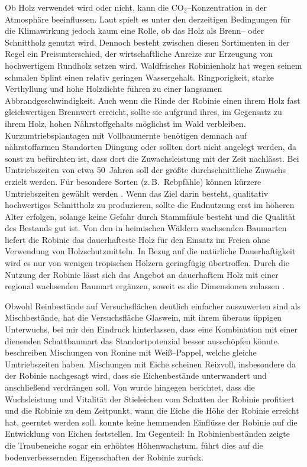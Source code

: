 \documentclass[twocolumn]{scrartcl}
\begin{document}
Ob Holz verwendet wird oder nicht, kann die CO$_2$--Konzentration in
der Atmosphäre beeinflussen. Laut
\citet{boiger2024schnittholzBrennholz} spielt es unter den derzeitigen
Bedingungen für die Klimawirkung jedoch kaum eine Rolle, ob das Holz
als Brenn-- oder Schnittholz genutzt wird. Dennoch besteht zwischen
diesen Sortimenten in der Regel ein Preisunterschied, der
wirtschaftliche Anreize zur Erzeugung von hochwertigem Rundholz setzen
wird. Waldfrisches Robinienholz hat wegen seinem schmalen Splint einen
relativ geringen Wassergehalt.  Ringporigkeit, starke Verthyllung und
hohe Holzdichte führen zu einer langsamen Abbrandgeschwindigkeit.
Auch wenn die Rinde der Robinie einen ihrem Holz fast gleichwertigen
Brennwert erreicht, sollte sie aufgrund ihres, im Gegensatz zu ihrem
Holz, hohen Nährstoffgehalts möglichst im Wald verbleiben.
Kurzumtriebsplantagen mit Vollbaumernte benötigen demnach auf
nährstoffarmen Standorten Düngung oder sollten dort nicht angelegt
werden, da sonst zu befürchten ist, dass dort die Zuwachsleistung mit der Zeit
nachlässt. Bei Umtriebszeiten von etwa 50~Jahren soll der größte
durchschnittliche Zuwachs erzielt werden.
Für besondere Sorten (z.\,B.\ Rebpfähle) können kürzere Umtriebszeiten
gewählt werden \citep[S.~136]{erteld1952robinieErtrag}.
Wenn das Ziel darin besteht, qualitativ hochwertiges Schnittholz zu
produzieren, sollte die Endnutzung erst im höheren Alter erfolgen,
solange keine Gefahr durch Stammfäule besteht und die Qualität des
Bestands gut ist.
Von den in heimischen Wäldern wachsenden Baumarten liefert
die Robinie das dauerhafteste Holz für den Einsatz im Freien ohne
Verwendung von Holzschutzmitteln. In Bezug auf die natürliche
Dauerhaftigkeit wird es nur von wenigen tropischen Hölzern geringfügig
übertroffen. Durch die Nutzung der Robinie lässt sich das Angebot an
dauerhaftem Holz mit einer regional wachsenden Baumart ergänzen,
soweit es die Dimensionen zulassen
\citep{benthien2020robinieTropenholz,sari2005robinienholz}.

Obwohl Reinbestände auf Versuchsflächen deutlich einfacher auszuwerten sind als Mischbestände,
hat die Versuchsfläche Glaswein, mit ihrem überaus üppigen Unterwuchs, bei mir den Eindruck hinterlassen,
dass eine Kombination mit einer dienenden Schattbaumart das Standortpotenzial besser ausschöpfen könnte.
\citet{redei2006robiniePappel}
beschreiben Mischungen von Ronine mit Weiß--Pappel, welche gleiche
Umtriebszeiten haben. Mischungen mit Eiche scheinen Reizvoll,
insbesondere da der Robinie nachgesagt wird, dass sie Eichenbestände
unterwandert und anschließend verdrängen soll. Von \citet{kallina1888robinie} wurde
hingegen berichtet, dass die Wuchsleistung und Vitalität der
Stieleichen vom Schatten der Robinie profitiert und die Robinie zu dem
Zeitpunkt, wann die Eiche die Höhe der Robinie erreicht hat, geerntet
werden soll. \citet{feher2024robinie} konnte keine hemmenden Einflüsse
der Robinie auf die Entwicklung von Eichen feststellen. Im Gegenteil:
In Robinienbeständen zeigte die Traubeneiche sogar ein erhöhtes
Höhenwachstum. \citet{foeldes1903robinie} führt dies auf die
bodenverbessernden Eigenschaften der Robinie zurück.
\end{document}
